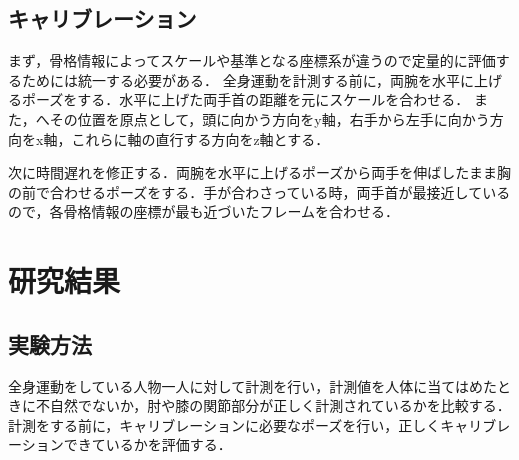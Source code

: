 \documentclass[titlepage]{jarticle}
\begin{document}
\subsection{キャリブレーション}
まず，骨格情報によってスケールや基準となる座標系が違うので定量的に評価するためには統一する必要がある．
全身運動を計測する前に，両腕を水平に上げるポーズをする．水平に上げた両手首の距離を元にスケールを合わせる．
また，へその位置を原点として，頭に向かう方向をy軸，右手から左手に向かう方向をx軸，これらに軸の直行する方向をz軸とする．

次に時間遅れを修正する．両腕を水平に上げるポーズから両手を伸ばしたまま胸の前で合わせるポーズをする．手が合わさっている時，両手首が最接近しているので，各骨格情報の座標が最も近づいたフレームを合わせる．


\section{研究結果}
\subsection{実験方法}
全身運動をしている人物一人に対して計測を行い，計測値を人体に当てはめたときに不自然でないか，肘や膝の関節部分が正しく計測されているかを比較する．
計測をする前に，キャリブレーションに必要なポーズを行い，正しくキャリブレーションできているかを評価する．
\end{document}
